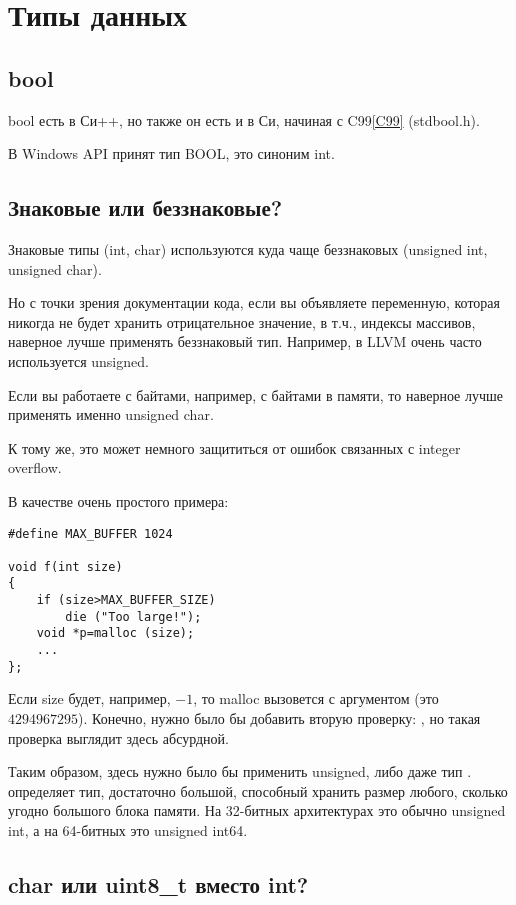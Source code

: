 ﻿\section{Типы данных}

\subsection{bool}

bool есть в Си++, но также он есть и в Си, начиная с C99\ref{C99} (stdbool.h).

В Windows API принят тип BOOL, это синоним int.

\subsection{Знаковые или беззнаковые?}

Знаковые типы (int, char) используются куда чаще беззнаковых (unsigned int, unsigned char).

Но с точки зрения документации кода, если вы объявляете переменную, которая никогда не будет хранить отрицательное
значение, в т.ч., индексы массивов, наверное лучше применять беззнаковый тип.
Например, в LLVM очень часто используется unsigned.

Если вы работаете с байтами, например, с байтами в памяти, то наверное лучше применять именно unsigned char.

К тому же, это может немного защититься от ошибок связанных с integer overflow\cite{Phrack3C0A}.

В качестве очень простого примера:

\begin{lstlisting}
#define MAX_BUFFER 1024

void f(int size)
{
	if (size>MAX_BUFFER_SIZE)
		die ("Too large!");
	void *p=malloc (size);
	...
};
\end{lstlisting}

Если size будет, например, $-1$, то malloc вызовется с аргументом  (это $4294967295$).
Конечно, нужно было бы добавить вторую проверку: , но такая проверка выглядит здесь абсурдной.

Таким образом, здесь нужно было бы применить unsigned, либо даже тип . 
 определяет тип, достаточно большой,
способный хранить размер любого, сколько угодно большого блока памяти.
На 32-битных архитектурах это обычно unsigned int,
а на 64-битных это unsigned int64.

\subsection{char или uint8\_t вместо int?}

